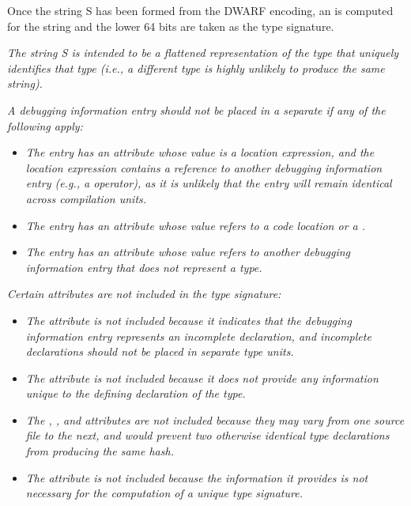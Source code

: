 Once the string S has been formed from the DWARF encoding,
an  is computed for the string and the lower 64 bits
are taken as the type signature.

\textit{The string S is intended to be a flattened representation of
the type that uniquely identifies that type (i.e., a different
type is highly unlikely to produce the same string).}

\textit{A debugging information entry should not be placed in a
separate 
if any of the following apply:}

\begin{itemize}

\item \textit{The entry has an attribute whose value is a location
expression, and the location expression contains a reference to
another debugging information entry (e.g., a 
operator), as it is unlikely that the entry will remain
identical across compilation units.}

\item \textit{The entry has an attribute whose value refers
to a code location or a .}

\item \textit{The entry has an attribute whose value refers
to another debugging information entry that does not represent
a type.}
\end{itemize}


\textit{Certain attributes are not included in the type signature:}

\begin{itemize}
\item \textit{The  attribute is not included because it
indicates that the debugging information entry represents an
incomplete declaration, and incomplete declarations should
not be placed in 
separate type units.}

\item \textit{The  attribute is not included because
it does not provide any information unique to the defining
declaration of the type.}

\item \textit{The , 
, and
 attributes are not included because they
may vary from one source file to the next, and would prevent
two otherwise identical type declarations from producing the
same hash.}

\item \textit{The  attribute is not included 
because the information it provides is not necessary for the 
computation of a unique type signature.}

\end{itemize}

